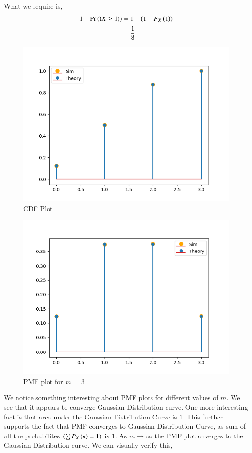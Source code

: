 \documentclass[journal]{IEEEtran}
\begin{document}
What we require is,
\begin{align}
  1 - \Pr\left(\left(X \ge 1\right)\right) &= 1 - \left(1 - F_X\left(1\right) \right) \\
   &= \frac{1}{8}
\end{align}
\begin{figure}[h!]
  \centering
  \includegraphics[width=0.7\columnwidth]{figs/cdf.png}
  \caption{CDF Plot}
  \label{label}
\end{figure}

\begin{figure}[h!]
  \centering
  \includegraphics[width=0.7\columnwidth]{figs/pmf_1.png}
  \caption{PMF plot for $m$ = 3}
  \label{label}
\end{figure}

We notice something interesting about PMF plots for different values of $m$. We see that it appears to converge Gaussian Distribution curve. One more interesting fact is that area under the Gaussian Distribution Curve is $1$. This further supports the fact that PMF converges to Gaussian Distribution Curve, as sum of all the probabilites $\left(\sum P_X\left(n\right) = 1\right)$ is $1$.  As $m \rightarrow \infty$ the PMF plot onverges to the Gaussian Distribution curve. We can visually verify this, \newline
\end{document}
